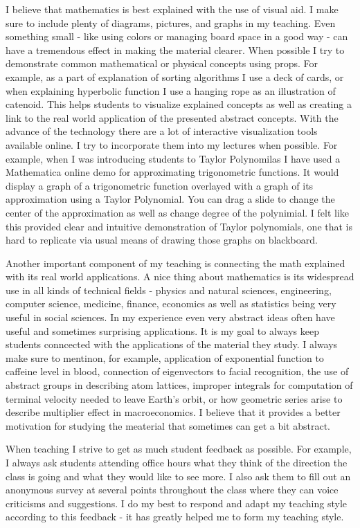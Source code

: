 \documentclass[11pt]{article}
\begin{document}
I believe that mathematics is best explained with the use of visual aid.
I make sure to include plenty of diagrams, pictures, and graphs in my teaching.
Even something small - like using colors or managing board space in a good way - can have a tremendous effect in making the material clearer.
When possible I try to demonstrate common mathematical or physical concepts using props.
For example, as a part of explanation of sorting algorithms I use a deck of cards,
or when explaining hyperbolic function I use a hanging rope as an illustration of catenoid.
This helps students to visualize explained concepts as well as creating a link to the real world application of the presented abstract concepts.
With the advance of the technology there are a lot of interactive visualization tools available online.
I try to incorporate them into my lectures when possible.
For example, when I was introducing students to Taylor Polynomilas I have used a Mathematica online demo for approximating trigonometric functions.
It would display a graph of a trigonometric function overlayed with a graph of its approximation using a Taylor Polynomial.
You can drag a slide to change the center of the approximation as well as change degree of the polynimial.
I felt like this provided clear and intuitive demonstration of Taylor polynomials, one that is hard to replicate via usual means of drawing those graphs on blackboard.

Another important component of my teaching is connecting the math explained with its real world applications.
A nice thing about mathematics is its widespread use in all kinds of technical fields - physics and natural sciences, engineering, computer science, medicine, finance, economics as well as statistics being very useful in social sciences.
In my experience even very abstract ideas often have useful and sometimes surprising applications.
It is my goal to always keep students conncected with the applications of the material they study.
I always make sure to mentinon, for example, application of exponential function to caffeine level in blood, connection of eigenvectors to facial recognition, the use of abstract groups in describing atom lattices, improper integrals for computation of terminal velocity needed to leave Earth's orbit, or how geometric series arise to describe multiplier effect in macroeconomics.
I believe that it provides a better motivation for studying the meaterial that sometimes can get a bit abstract.

When teaching I strive to get as much student feedback as possible.
For example, I always ask students attending office hours what they think of the direction the class is going and what they would like to see more.
I also ask them to fill out an anonymous survey at several points throughout the class where they can voice criticisms and suggestions.
I do my best to respond and adapt my teaching style according to this feedback - it has greatly helped me to form my teaching style.
\end{document}
